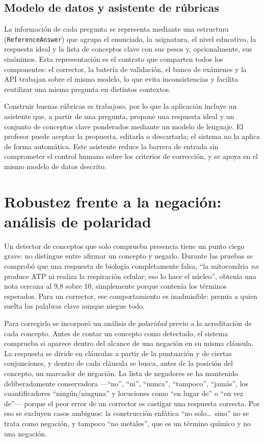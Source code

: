 \subsection{Modelo de datos y asistente de rúbricas}

La información de cada pregunta se representa mediante una estructura (\texttt{ReferenceAnswer}) que agrupa el enunciado, la asignatura, el nivel educativo, la respuesta ideal y la lista de conceptos clave con sus pesos y, opcionalmente, sus sinónimos. Esta representación es el contrato que comparten todos los componentes: el corrector, la batería de validación, el banco de exámenes y la API trabajan sobre el mismo modelo, lo que evita inconsistencias y facilita reutilizar una misma pregunta en distintos contextos.

Construir buenas rúbricas es trabajoso, por lo que la aplicación incluye un asistente que, a partir de una pregunta, propone una respuesta ideal y un conjunto de conceptos clave ponderados mediante un modelo de lenguaje. El profesor puede aceptar la propuesta, editarla o descartarla; el sistema no la aplica de forma automática. Este asistente reduce la barrera de entrada sin comprometer el control humano sobre los criterios de corrección, y se apoya en el mismo modelo de datos descrito.

\section{Robustez frente a la negación: análisis de polaridad}
\label{sec:polaridad}

Un detector de conceptos que solo comprueba presencia tiene un punto ciego grave: no distingue entre afirmar un concepto y negarlo. Durante las pruebas se comprobó que una respuesta de biología completamente falsa, ``la mitocondria \emph{no} produce ATP ni realiza la respiración celular; eso lo hace el núcleo'', obtenía una nota cercana al 9{,}8 sobre 10, simplemente porque contenía los términos esperados. Para un corrector, ese comportamiento es inadmisible: premia a quien suelta las palabras clave aunque niegue todo.

Para corregirlo se incorporó un análisis de \emph{polaridad} previo a la acreditación de cada concepto. Antes de contar un concepto como detectado, el sistema comprueba si aparece dentro del alcance de una negación en su misma cláusula. La respuesta se divide en cláusulas a partir de la puntuación y de ciertas conjunciones, y dentro de cada cláusula se busca, antes de la posición del concepto, un marcador de negación. La lista de negadores se ha mantenido deliberadamente conservadora —``no'', ``ni'', ``nunca'', ``tampoco'', ``jamás'', los cuantificadores ``ningún/ninguna'' y locuciones como ``en lugar de'' o ``en vez de''— porque el peor error de un corrector es castigar una respuesta correcta. Por eso se excluyen casos ambiguos: la construcción enfática ``no solo\dots\ sino'' no se trata como negación, y tampoco ``no metales'', que es un término químico y no una negación.


